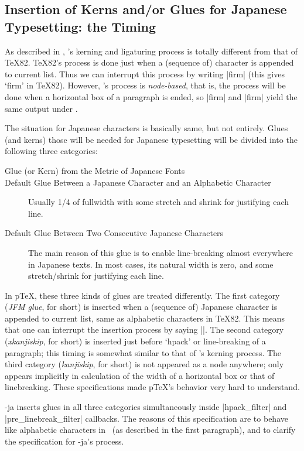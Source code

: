 \documentclass{ajt}
\begin{document}
\subsection{Insertion of Kerns and/or Glues for Japanese Typesetting: the Timing}
As described in \cite{luatexref}, \LuaTeX's kerning and ligaturing
process is totally different from that of \TeX82.
\TeX82's process is done just when a (sequence of) character is appended
to current list. Thus we can interrupt this process by writing |f{}irm|
(this gives `f\hbox{}irm' in \TeX82). However, \LuaTeX's process is
\emph{node-based}, that is, the process will be done when a horizontal
box of a paragraph is ended, so |f{}irm| and |firm| yield the same
output under \LuaTeX.

The situation for Japanese characters is basically same, but not
entirely.  Glues (and kerns) those will be needed for Japanese
typesetting will be divided into the following three categories:
\begin{description}
\item[Glue (or Kern) from the Metric of Japanese Fonts] 
\item[Default Glue Between a Japanese Character and an Alphabetic Character] 
Usually 1/4 of fullwidth with some stretch and shrink for justifying each line.
\item[Default Glue Between Two Consecutive Japanese Characters] 
The main reason of this glue is to enable line-breaking almost everywhere in Japanese texts. In most cases, its natural width is zero, and
some stretch/shrink for justifying each line. 
\end{description}
In p\TeX, these three kinds of glues are treated differently. The first
 category (\emph{JFM glue}, for short) is inserted when a (sequence of)
 Japanese character is appended to current list, same as alphabetic
 characters in \TeX82. This means that one can interrupt the insertion
 process by saying |{}|.  The second category (\emph{xkanjiskip}, for
 short) is inserted just before `hpack' or line-breaking of a paragraph;
 this timing is somewhat similar to that of \LuaTeX's kerning
 process. The third category (\emph{kanjiskip}, for short) is not
 appeared as a node anywhere; only appears implicitly in calculation of the
 width of a horizontal box or that of linebreaking. These specifications made
 p\TeX's behavior very hard to understand.

\LuaTeX-ja inserts glues in all three categories simultaneously inside
|hpack_filter| and |pre_linebreak_filter| callbacks.  The reasons of
this specification are to behave like alphabetic characters in \LuaTeX\
(as described in the first paragraph), and to clarify the specification
for \LuaTeX-ja's process. 
\end{document}
